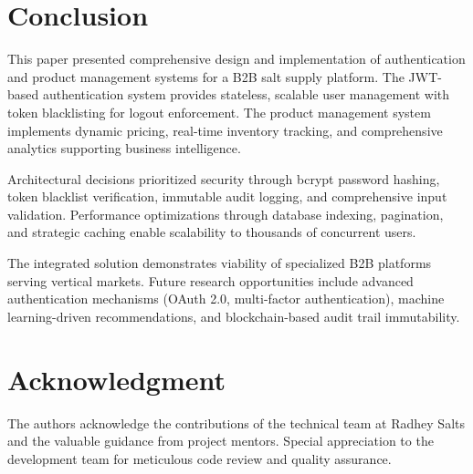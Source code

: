 \documentclass[conference]{IEEEtran}
\begin{document}
\section{Conclusion}

This paper presented comprehensive design and implementation of authentication and product management systems for a B2B salt supply platform. The JWT-based authentication system provides stateless, scalable user management with token blacklisting for logout enforcement. The product management system implements dynamic pricing, real-time inventory tracking, and comprehensive analytics supporting business intelligence.

Architectural decisions prioritized security through bcrypt password hashing, token blacklist verification, immutable audit logging, and comprehensive input validation. Performance optimizations through database indexing, pagination, and strategic caching enable scalability to thousands of concurrent users.

The integrated solution demonstrates viability of specialized B2B platforms serving vertical markets. Future research opportunities include advanced authentication mechanisms (OAuth 2.0, multi-factor authentication), machine learning-driven recommendations, and blockchain-based audit trail immutability.

\section*{Acknowledgment}

The authors acknowledge the contributions of the technical team at Radhey Salts and the valuable guidance from project mentors. Special appreciation to the development team for meticulous code review and quality assurance.
\end{document}
